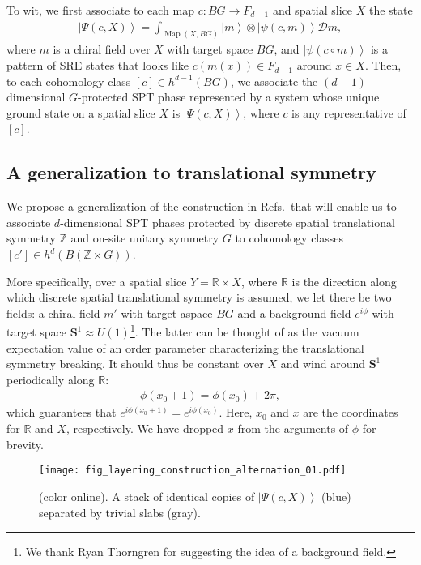 \documentclass[sort&compress]{elsarticle}
\theoremstyle{theoremstyle}
\theoremstyle{framedtheoremstyle}
\theoremstyle{definitionstyle}
\theoremstyle{definitionstyle}
\theoremstyle{definitionstyle}
\theoremstyle{definitionstyle}
\theoremstyle{nameddefinitionstyle}
\theoremstyle{framednameddefinitionstyle}
\theoremstyle{proofstyle}
\theoremstyle{definitionstyle}
\newcommand{\fromto}{\rightarrow}
\newcommand{\ZZZ}{\mathbb{Z}}
\newcommand{\RRR}{\mathbb{R}}
\renewcommand{\SS}{\mathbf{S}}
\newcommand{\D}{\mathcal{D}}
\DeclareMathOperator{\Map}{Map}
\newcommand{\homeomorphic}{\approx}
\newcommand{\paren}[1]{\left( #1 \right)}
\newcommand{\brackets}[1]{\left[ #1 \right]}
\newcommand{\ket}[1]{\left|#1\right\rangle}
\begin{document}
\begin{appendices}
To wit, we first associate to each map $c: BG \fromto F_{d-1}$ and spatial slice $X$ the state
\begin{eqnarray}
\ket{\Psi\paren{c, X}} = \int_{\Map\paren{X, BG}} \ket{m} \otimes \ket{\psi\paren{c,m}} \D m,
\end{eqnarray}
where $m$ is a chiral field over $X$ with target space $BG$, and $\ket{\psi(c \circ m)}$ is a pattern of SRE states that looks like $c\paren{m(x)} \in F_{d-1}$ around $x \in X$. Then, to each cohomology class $\brackets{c} \in h^{d-1} \paren{BG}$, we associate the $(d-1)$-dimensional $G$-protected SPT phase represented by a system whose unique ground state on a spatial slice $X$ is $\ket{\Psi\paren{c,X}}$, where $c$ is any representative of $\brackets{c}$.





\subsection{A generalization to translational symmetry \label{subapp:generalization_translational_symmetry}}

We propose a generalization of the construction in Refs.\,\cite{Kitaev_Stony_Brook_2013_SRE, Kitaev_KITP} that will enable us to associate $d$-dimensional SPT phases protected by discrete spatial translational symmetry $\ZZZ$ and on-site unitary symmetry $G$ to cohomology classes $\brackets{c'} \in h^d\paren{B\paren{\ZZZ \times G}}$.

More specifically, over a spatial slice $Y = \RRR \times X$, where $\RRR$ is the direction along which discrete spatial translational symmetry is assumed, we let there be two fields: a chiral field $m'$ with target aspace $BG$ and a background field $e^{i\phi}$ with target space $\SS^1 \homeomorphic U(1)$\footnote{We thank Ryan Thorngren for suggesting the idea of a background field.}. The latter can be thought of as the vacuum expectation value of an order parameter characterizing the translational symmetry breaking. It should thus be constant over $X$ and wind around $\SS^1$ periodically along $\RRR$:
\begin{eqnarray}
\phi( x_0 + 1 ) = \phi(x_0) + 2\pi,
\end{eqnarray}
which guarantees that 
$e^{i\phi(x_0+1)} = e^{i\phi(x_0)}$.
Here, $x_0$ and $x$ are the coordinates for $\RRR$ and $X$, respectively. We have dropped $x$ from the arguments of $\phi$ for brevity.

\begin{figure}
\centering
\texttt{[image: fig\_layering\_construction\_alternation\_01.pdf]}
\caption{(color online). A stack of identical copies of $\ket{\Psi\paren{c, X}}$ (blue) separated by trivial slabs (gray).}
\label{fig:layering_construction_alternation}
\end{figure}


\end{appendices}
\end{document}
